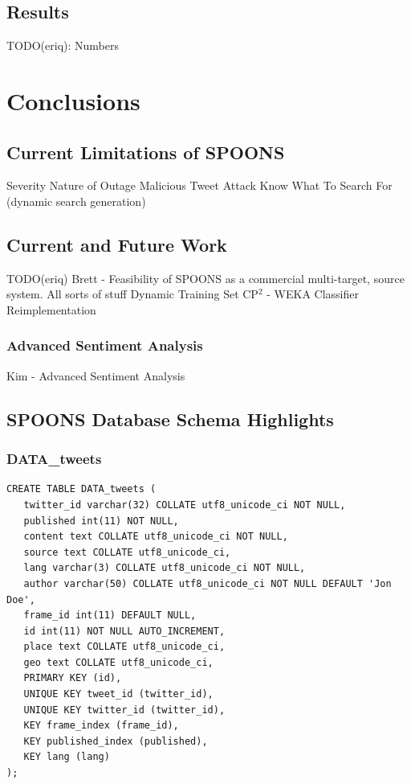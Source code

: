 \documentclass[12pt]{ucthesis}
\begin{document}
\chapter{Results}
\label{outage-detection-results}
TODO(eriq): Numbers

\part{Conclusions}
\label{conclusions}

\chapter{Current Limitations of SPOONS}
\label{limitations}
Severity
Nature of Outage
Malicious Tweet Attack
Know What To Search For (dynamic search generation)

\chapter{Current and Future Work}
\label{future-work}
TODO(eriq)
Brett - Feasibility of SPOONS as a commercial multi-target, source system.
All sorts of stuff
Dynamic Training Set
CP$^{2}$ - WEKA Classifier Reimplementation

\section{Advanced Sentiment Analysis}
\label{future-work-kim}
Kim - Advanced Sentiment Analysis


\appendix
\chapter{SPOONS Database Schema Highlights}
\label{appendix-db-schema}

\section{DATA\_tweets}
\begin{lstlisting}
CREATE TABLE DATA_tweets (
   twitter_id varchar(32) COLLATE utf8_unicode_ci NOT NULL,
   published int(11) NOT NULL,
   content text COLLATE utf8_unicode_ci NOT NULL,
   source text COLLATE utf8_unicode_ci,
   lang varchar(3) COLLATE utf8_unicode_ci NOT NULL,
   author varchar(50) COLLATE utf8_unicode_ci NOT NULL DEFAULT 'Jon Doe',
   frame_id int(11) DEFAULT NULL,
   id int(11) NOT NULL AUTO_INCREMENT,
   place text COLLATE utf8_unicode_ci,
   geo text COLLATE utf8_unicode_ci,
   PRIMARY KEY (id),
   UNIQUE KEY tweet_id (twitter_id),
   UNIQUE KEY twitter_id (twitter_id),
   KEY frame_index (frame_id),
   KEY published_index (published),
   KEY lang (lang)
);
\end{lstlisting}
\end{document}
